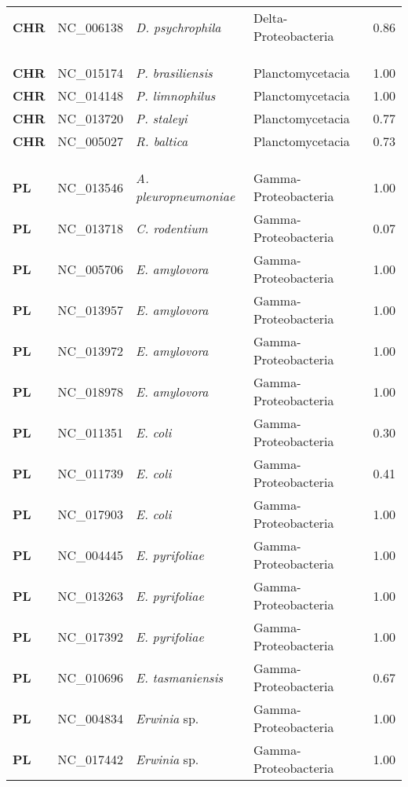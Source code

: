 \begin{adjustwidth}{-3cm}{2cm}
{\begin{supertabular}{>{\bfseries}l|p{0.1\textwidth}p{0.14\textwidth}l|l}
CHR & NC\_006138 & \textit{D. psychrophila} & Delta-Proteobacteria & 0.86\\
\\
\\
\hline\\
CHR & NC\_015174 & \textit{P. brasiliensis} & Planctomycetacia & 1.00\\
CHR & NC\_014148 & \textit{P. limnophilus} & Planctomycetacia & 1.00\\
CHR & NC\_013720 & \textit{P. staleyi} & Planctomycetacia & 0.77\\
CHR & NC\_005027 & \textit{R. baltica} & Planctomycetacia & 0.73\\
\\
\\
\hline\\
PL & NC\_013546 & \textit{A. pleuropneumoniae} & Gamma-Proteobacteria & 1.00\\
PL & NC\_013718 & \textit{C. rodentium} & Gamma-Proteobacteria & 0.07\\
PL & NC\_005706 & \textit{E. amylovora} & Gamma-Proteobacteria & 1.00\\
PL & NC\_013957 & \textit{E. amylovora} & Gamma-Proteobacteria & 1.00\\
PL & NC\_013972 & \textit{E. amylovora} & Gamma-Proteobacteria & 1.00\\
PL & NC\_018978 & \textit{E. amylovora} & Gamma-Proteobacteria & 1.00\\
PL & NC\_011351 & \textit{E. coli} & Gamma-Proteobacteria & 0.30\\
PL & NC\_011739 & \textit{E. coli} & Gamma-Proteobacteria & 0.41\\
PL & NC\_017903 & \textit{E. coli} & Gamma-Proteobacteria & 1.00\\
PL & NC\_004445 & \textit{E. pyrifoliae} & Gamma-Proteobacteria & 1.00\\
PL & NC\_013263 & \textit{E. pyrifoliae} & Gamma-Proteobacteria & 1.00\\
PL & NC\_017392 & \textit{E. pyrifoliae} & Gamma-Proteobacteria & 1.00\\
PL & NC\_010696 & \textit{E. tasmaniensis} & Gamma-Proteobacteria & 0.67\\
PL & NC\_004834 & \textit{Erwinia} sp. & Gamma-Proteobacteria & 1.00\\
PL & NC\_017442 & \textit{Erwinia} sp. & Gamma-Proteobacteria & 1.00\\

\end{supertabular}}
\end{adjustwidth}

